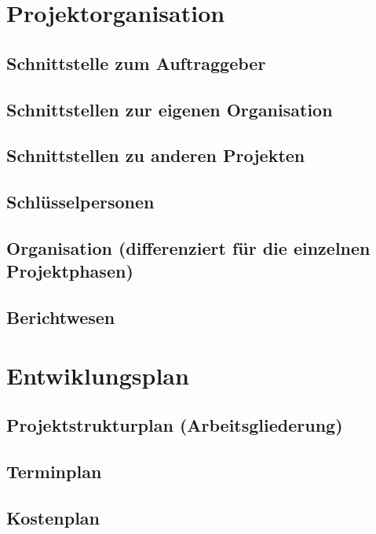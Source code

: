 \documentclass[a4paper,10pt]{scrartcl}
\begin{document}
\section{Projektorganisation}
\subsection{Schnittstelle zum Auftraggeber}
\subsection{Schnittstellen zur eigenen Organisation}
\subsection{Schnittstellen zu anderen Projekten}
\subsection{Schlüsselpersonen}
\subsection{Organisation (differenziert für die einzelnen Projektphasen)}
\subsection{Berichtwesen}


\section{Entwiklungsplan}
\subsection{Projektstrukturplan (Arbeitsgliederung)}
\subsection{Terminplan}
\subsection{Kostenplan}
\end{document}
